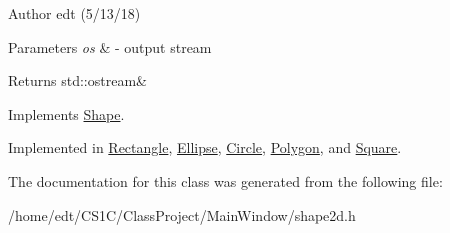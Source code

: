 \begin{DoxyAuthor}{Author}
edt (5/13/18)
\end{DoxyAuthor}

\begin{DoxyParams}{Parameters}
{\em os} & -\/ output stream\\
\hline
\end{DoxyParams}
\begin{DoxyReturn}{Returns}
std\-::ostream\& 
\end{DoxyReturn}


Implements \hyperlink{classShape}{Shape}.



Implemented in \hyperlink{classRectangle_a06528cd92243f56f5eca551c5d637657}{Rectangle}, \hyperlink{classEllipse_a6cd8da652c6e66f465fb23253deab458}{Ellipse}, \hyperlink{classCircle_a8afb61e2e5b24c95d0d4514da1d45bb2}{Circle}, \hyperlink{classPolygon_ae1d7135748131313fac844463013931e}{Polygon}, and \hyperlink{classSquare_af2b00ed5022d4eefcbafe31cc77535f6}{Square}.



The documentation for this class was generated from the following file\-:\begin{DoxyCompactItemize}
\item 
/home/edt/\-C\-S1\-C/\-Class\-Project/\-Main\-Window/shape2d.\-h\end{DoxyCompactItemize}
